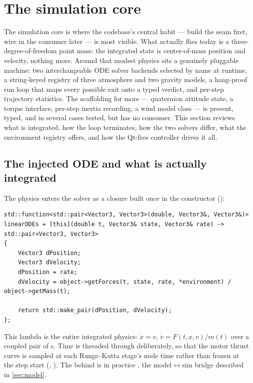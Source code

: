 \section{The simulation core}\label{sec:sim}

The simulation core is where the codebase's central habit --- build the seam first, wire in the
consumer later --- is most visible. What actually flies today is a three-degree-of-freedom point
mass: the integrated state is center-of-mass position and velocity, nothing more. Around that
modest physics sits a genuinely pluggable machine: two interchangeable ODE solver backends selected
by name at runtime, a string-keyed registry of three atmosphere and two gravity models, a
hang-proof run loop that maps every possible exit onto a typed verdict, and per-step trajectory
statistics. The scaffolding for more --- quaternion attitude state, a torque interface, per-step
inertia recording, a wind model class --- is present, typed, and in several cases tested, but has
no consumer. This section reviews what is integrated, how the loop terminates, how the two solvers
differ, what the environment registry offers, and how the Qt-free  controller
drives it all.

\subsection{The injected ODE and what is actually integrated}\label{sec:sim-ode}

The physics enters the solver as a closure built once in the  constructor
():

\begin{verbatim}
std::function<std::pair<Vector3, Vector3>(double, Vector3&, Vector3&)> linearODEs = [this](double t, Vector3& state, Vector3& rate) -> std::pair<Vector3, Vector3>
{
    Vector3 dPosition;
    Vector3 dVelocity;
    dPosition = rate;
    dVelocity = object->getForces(t, state, rate, *environment) / object->getMass(t);

    return std::make_pair(dPosition, dVelocity);
};
\end{verbatim}

\noindent This lambda is the entire integrated physics: $\dot{x}=v$, $\dot{v}=F(t,x,v)/m(t)$ over
a coupled pair of s. Time is threaded through deliberately, so that the motor thrust
curve is sampled at each Runge--Kutta stage's node time rather than frozen at the step start
(, ). The  behind
 is in practice , the model$\leftrightarrow$sim bridge described in
\cref{sec:model}.


